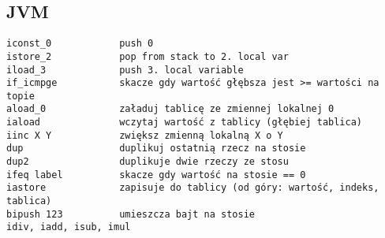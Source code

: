 \subsection{JVM}
\begin{verbatim}
iconst_0            push 0
istore_2            pop from stack to 2. local var
iload_3             push 3. local variable
if_icmpge           skacze gdy wartość głębsza jest >= wartości na topie
aload_0             załaduj tablicę ze zmiennej lokalnej 0
iaload              wczytaj wartość z tablicy (głębiej tablica)
iinc X Y            zwiększ zmienną lokalną X o Y
dup                 duplikuj ostatnią rzecz na stosie
dup2                duplikuje dwie rzeczy ze stosu
ifeq label          skacze gdy wartość na stosie == 0
iastore             zapisuje do tablicy (od góry: wartość, indeks, tablica)
bipush 123          umieszcza bajt na stosie
idiv, iadd, isub, imul
\end{verbatim}
